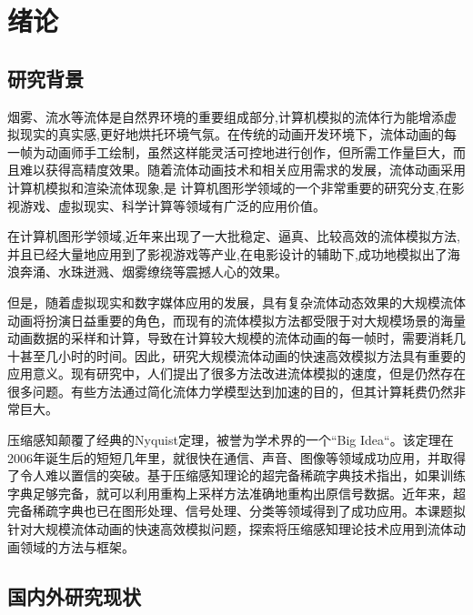
\chapter{绪论}
\label{chap:background}

\section{研究背景}

烟雾、流水等流体是自然界环境的重要组成部分,计算机模拟的流体行为能增添虚拟现实的真实感,更好地烘托环境气氛。在传统的动画开发环境下，流体动画的每一帧为动画师手工绘制，虽然这样能灵活可控地进行创作，但所需工作量巨大，而且难以获得高精度效果。随着流体动画技术和相关应用需求的发展，流体动画采用计算机模拟和渲染流体现象,是 计算机图形学领域的一个非常重要的研究分支,在影视游戏、虚拟现实、科学计算等领域有广泛的应用价值。

在计算机图形学领域,近年来出现了一大批稳定、逼真、比较高效的流体模拟方法,并且已经大量地应用到了影视游戏等产业,在电影设计的辅助下,成功地模拟出了海浪奔涌、水珠迸溅、烟雾缭绕等震撼人心的效果。

但是，随着虚拟现实和数字媒体应用的发展，具有复杂流体动态效果的大规模流体动画将扮演日益重要的角色，而现有的流体模拟方法都受限于对大规模场景的海量动画数据的采样和计算，导致在计算较大规模的流体动画的每一帧时，需要消耗几十甚至几小时的时间。因此，研究大规模流体动画的快速高效模拟方法具有重要的应用意义。现有研究中，人们提出了很多方法改进流体模拟的速度，但是仍然存在很多问题。有些方法通过简化流体力学模型达到加速的目的，但其计算耗费仍然非常巨大。

压缩感知颠覆了经典的Nyquist定理，被誉为学术界的一个“Big Idea“。该定理在2006年诞生后的短短几年里，就很快在通信、声音、图像等领域成功应用，并取得了令人难以置信的突破。基于压缩感知理论的超完备稀疏字典技术指出，如果训练字典足够完备，就可以利用重构上采样方法准确地重构出原信号数据。近年来，超完备稀疏字典也已在图形处理、信号处理、分类等领域得到了成功应用。本课题拟针对大规模流体动画的快速高效模拟问题，探索将压缩感知理论技术应用到流体动画领域的方法与框架。

\section{国内外研究现状}
